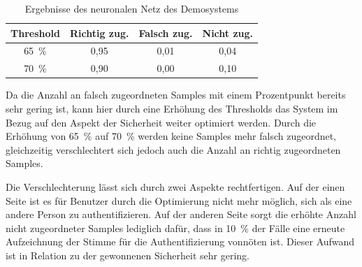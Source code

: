 \begin{table}[H]
    \centering
    \begin{tabular}{c|c|c|c}
        Threshold & Richtig zug. & Falsch zug. & Nicht zug. \\ \hline
        65~\%     & 0,95         & 0,01        & 0,04       \\ \hline
        70~\%     & 0,90         & 0,00        & 0,10       \\ 
    \end{tabular}
    \caption{Ergebnisse des neuronalen Netz des Demosystems}
    \label{table:resultsDemoSystemNN}
\end{table}

Da die Anzahl an falsch zugeordneten Samples mit einem Prozentpunkt bereits sehr gering ist, kann hier durch eine Erhöhung des Thresholds das System im Bezug auf den Aspekt der Sicherheit weiter optimiert werden.
Durch die Erhöhung von 65~\% auf 70~\% werden keine Samples mehr falsch zugeordnet, gleichzeitig verschlechtert sich jedoch auch die Anzahl an richtig zugeordneten Samples.

Die Verschlechterung lässt sich durch zwei Aspekte rechtfertigen.
Auf der einen Seite ist es für Benutzer durch die Optimierung nicht mehr möglich, sich als eine andere Person zu authentifizieren.
Auf der anderen Seite sorgt die erhöhte Anzahl nicht zugeordneter Samples lediglich dafür, dass in 10~\% der Fälle eine erneute Aufzeichnung der Stimme für die Authentifizierung vonnöten ist.
Dieser Aufwand ist in Relation zu der gewonnenen Sicherheit sehr gering.
